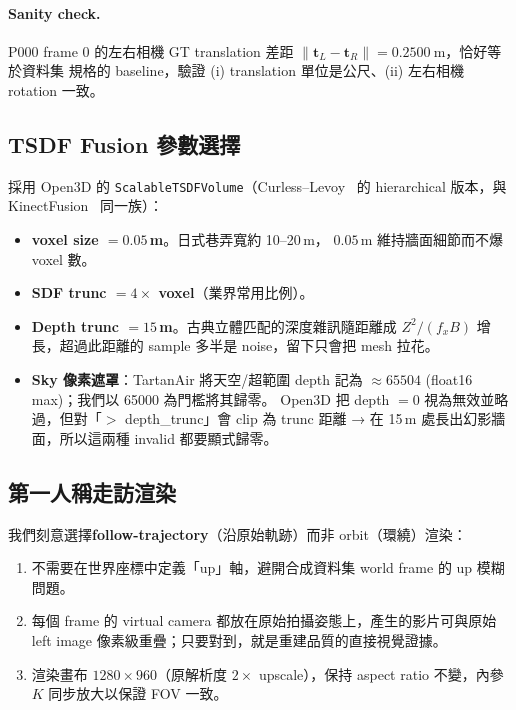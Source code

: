 \documentclass[11pt,a4paper]{article}
\begin{document}
\paragraph{Sanity check.} P000 frame 0 的左右相機 GT translation 差距
$\lVert \mathbf{t}_L - \mathbf{t}_R \rVert = \SI{0.2500}{\meter}$，恰好等於資料集
規格的 baseline，驗證 (i) translation 單位是公尺、(ii) 左右相機 rotation 一致。

\subsection{TSDF Fusion 參數選擇}
採用 Open3D 的 \texttt{ScalableTSDFVolume}（Curless--Levoy~\cite{Curless1996}
的 hierarchical 版本，與 KinectFusion~\cite{Newcombe2011} 同一族）：

\begin{itemize}[leftmargin=2em,itemsep=2pt]
\item \textbf{voxel size $=0.05$\,m}。日式巷弄寬約 10--20\,m，
$0.05$\,m 維持牆面細節而不爆 voxel 數。
\item \textbf{SDF trunc $=4\times$ voxel}（業界常用比例）。
\item \textbf{Depth trunc $=15$\,m}。古典立體匹配的深度雜訊隨距離成
$Z^2/(f_x B)$ 增長，超過此距離的 sample 多半是 noise，留下只會把 mesh 拉花。
\item \textbf{Sky 像素遮罩}：TartanAir 將天空/超範圍 depth 記為
$\approx65504$ (float16 max)；我們以 65000 為門檻將其歸零。
Open3D 把 depth $=0$ 視為無效並略過，但對「$>$ depth\_trunc」會 clip 為
trunc 距離 → 在 15\,m 處長出幻影牆面，所以這兩種 invalid 都要顯式歸零。
\end{itemize}

\subsection{第一人稱走訪渲染}
\label{sec:bonus-render}
我們刻意選擇\textbf{follow-trajectory}（沿原始軌跡）而非 orbit（環繞）渲染：
\begin{enumerate}[leftmargin=2em,itemsep=2pt]
\item 不需要在世界座標中定義「up」軸，避開合成資料集 world frame 的 up 模糊問題。
\item 每個 frame 的 virtual camera 都放在原始拍攝姿態上，產生的影片可與原始
left image 像素級重疊；只要對到，就是重建品質的直接視覺證據。
\item 渲染畫布 $1280\!\times\!960$（原解析度 $2\times$ upscale），保持
aspect ratio 不變，內參 $K$ 同步放大以保證 FOV 一致。
\end{enumerate}
\end{document}
